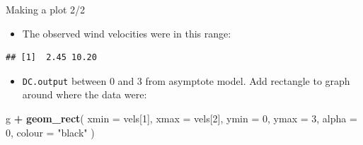 \documentclass[ignorenonframetext,]{beamer}
\newenvironment{Shaded}{\begin{snugshade}}{\end{snugshade}}
\newcommand{\DataTypeTok}[1]{\textcolor[rgb]{0.13,0.29,0.53}{#1}}
\newcommand{\DecValTok}[1]{\textcolor[rgb]{0.00,0.00,0.81}{#1}}
\newcommand{\KeywordTok}[1]{\textcolor[rgb]{0.13,0.29,0.53}{\textbf{#1}}}
\newcommand{\NormalTok}[1]{#1}
\newcommand{\OperatorTok}[1]{\textcolor[rgb]{0.81,0.36,0.00}{\textbf{#1}}}
\newcommand{\StringTok}[1]{\textcolor[rgb]{0.31,0.60,0.02}{#1}}
\providecommand{\tightlist}{%
  \setlength{\itemsep}{0pt}\setlength{\parskip}{0pt}}
\begin{document}
\begin{frame}[fragile]{Making a plot 2/2}
\protect\hypertarget{making-a-plot-22}{}

\begin{itemize}
\tightlist
\item
  The observed wind velocities were in this range:
\end{itemize}

\begin{Shaded}
\end{Shaded}

\begin{verbatim}
## [1]  2.45 10.20
\end{verbatim}

\begin{itemize}
\tightlist
\item
  \texttt{DC.output} between 0 and 3 from asymptote model. Add rectangle
  to graph around where the data were:
\end{itemize}

\begin{Shaded}
\begin{Highlighting}[]
\NormalTok{g }\OperatorTok{+}\StringTok{ }\KeywordTok{geom_rect}\NormalTok{(}
  \DataTypeTok{xmin =}\NormalTok{ vels[}\DecValTok{1}\NormalTok{], }\DataTypeTok{xmax =}\NormalTok{ vels[}\DecValTok{2}\NormalTok{], }\DataTypeTok{ymin =} \DecValTok{0}\NormalTok{, }\DataTypeTok{ymax =} \DecValTok{3}\NormalTok{,}
  \DataTypeTok{alpha =} \DecValTok{0}\NormalTok{, }\DataTypeTok{colour =} \StringTok{"black"}
\NormalTok{)}
\end{Highlighting}
\end{Shaded}

\end{frame}
\end{document}
